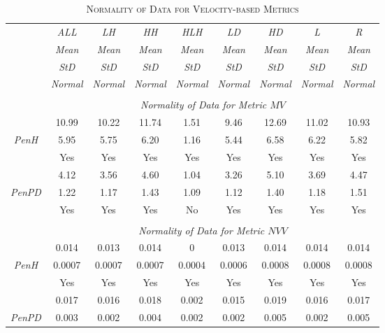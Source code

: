 \begin{table}[h]
\centering
\caption{\textsc{Normality of Data for Velocity-based Metrics}}
\begin{tabular*}{1\textwidth}{@{\extracolsep{\fill}} c | c  c  c  c  c  c  c  c}
	& {\textit{ALL}} & {\textit{LH}} & {\textit{HH}} & {\textit{HLH}} & {\textit{LD}} & {\textit{HD}} & {\textit{L}} & {\textit{R}} \\
	\cline{2-9} 
	\cline{2-9} 
	& {\textit{Mean}} & {\textit{Mean}} & {\textit{Mean}} & {\textit{Mean}} & {\textit{Mean}} & {\textit{Mean}} & {\textit{Mean}} & {\textit{Mean}} \\
	& {\textit{StD}} & {\textit{StD}} & {\textit{StD}} & {\textit{StD}} & {\textit{StD}} & {\textit{StD}} & {\textit{StD}} & {\textit{StD}} \\
	& {\textit{Normal}} & {\textit{Normal}} & {\textit{Normal}} & {\textit{Normal}} & {\textit{Normal}} & {\textit{Normal}} & {\textit{Normal}} & {\textit{Normal}} \\
	\cline{2-9}
	\\
	& \multicolumn{8}{c}{\textit{Normality of Data for Metric $MV$}} \\
	\hline 	\hline
	& 10.99 & 10.22 & 11.74 & 1.51 & 9.46 & 12.69 & 11.02 & 10.93 \\
	{\textit{PenH}} & 5.95 & 5.75 & 6.20 & 1.16 & 5.44 & 6.58 & 6.22 & 5.82 \\
	& Yes & Yes & Yes & Yes & Yes & Yes & Yes & Yes \\
	\hline
	& 4.12 & 3.56 & 4.60 & 1.04 & 3.26 & 5.10 & 3.69 & 4.47 \\
	{\textit{PenPD}} & 1.22 & 1.17 & 1.43 & 1.09 & 1.12 & 1.40 & 1.18 & 1.51 \\
	& Yes & Yes & Yes & No & Yes & Yes & Yes & Yes \\
	\\
	& \multicolumn{8}{c}{\textit{Normality of Data for Metric $NVV$}} \\
	\hline 	\hline
	& 0.014 & 0.013 & 0.014 & 0 & 0.013 & 0.014 & 0.014 & 0.014 \\
	{\textit{PenH}} & 0.0007 & 0.0007 & 0.0007 & 0.0004 & 0.0006 & 0.0008 & 0.0008 & 0.0008 \\
	& Yes & Yes & Yes & Yes & Yes & Yes & Yes & Yes \\
	\hline
	& 0.017 & 0.016 & 0.018 & 0.002 & 0.015 & 0.019 & 0.016 & 0.017 \\
	{\textit{PenPD}} & 0.003 & 0.002 & 0.004 & 0.002 & 0.002 & 0.005 & 0.002 & 0.005 \\

\end{tabular*}
\end{table}

